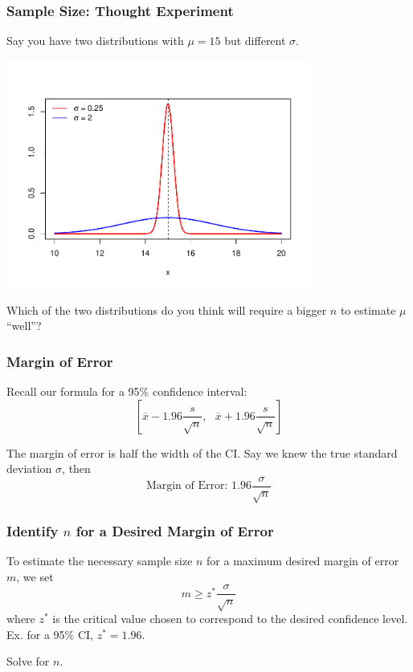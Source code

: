 \documentclass[handout]{beamer}
\newcommand{\blue}[1]{\textcolor{blue2}{#1}}
\begin{document}
\begin{frame}
\frametitle{Sample Size:  Thought Experiment}
Say you have two distributions with $\mu=15$ but different $\sigma$.
\begin{center}
\includegraphics[width=0.75\textwidth]{figure/norm.pdf}
\end{center}
\pause Which of the two distributions do you think will require a bigger $n$ to estimate $\mu$ ``well''?
\end{frame}


\begin{frame}
\frametitle{Margin of Error}
Recall our formula for a 95\% confidence interval:
\[\left[
\overline{x} - 1.96 \frac{s}{\sqrt n}, \mbox{  }
\overline{x} + 1.96 \frac{s}{\sqrt n}
\right]\]

\pause The margin of error is half the width of the CI.  Say we knew the \blue{true} standard deviation $\sigma$, then
\[
\mbox{Margin of Error: } 1.96 \frac{\sigma}{\sqrt n} 
\]
\end{frame}



\begin{frame}
\frametitle{Identify $n$ for a Desired Margin of Error}
To estimate the necessary sample size $n$ for a maximum desired margin of error $m$, we set
\[
m \geq z^* \frac{\sigma}{\sqrt{n}}
\]
\pause where $z^*$ is the \blue{critical value} chosen to correspond to the desired confidence level.  Ex. for a 95\% CI, $z^*=1.96$.

\vspace{0.25cm}

\pause Solve for $n$.  
\end{frame}
\end{document}
